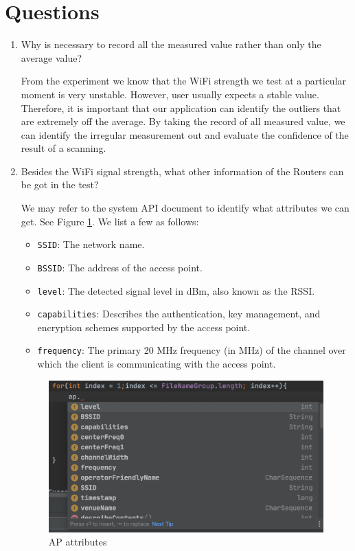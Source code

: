 \section{Questions}
\begin{enumerate}
  \item Why is necessary to record all the measured value rather than only the average value?
  
  From the experiment we know that the WiFi strength we test at a particular moment is very unstable. However, user usually expects a stable value. Therefore, it is important that our application can identify the outliers that are extremely off the average. By taking the record of all measured value, we can identify the irregular measurement out and evaluate the confidence of the result of a scanning.

  \item Besides the WiFi signal strength, what other information of the Routers can be got in the test?
  
  We may refer to the system API document to identify what attributes we can get. See Figure \ref{fig:attr}. We list a few as follows:
  \begin{itemize}
    \item \texttt{SSID}: The network name.
    \item \texttt{BSSID}: The address of the access point.
    \item \texttt{level}: The detected signal level in dBm, also known as the RSSI.
    \item \texttt{capabilities}: Describes the authentication, key management, and encryption schemes supported by the access point.
    \item \texttt{frequency}: The primary 20 MHz frequency (in MHz) of the channel over which the client is communicating with the access point.
  \end{itemize}

  \begin{figure}[hb]
    \begin{center}
    \includegraphics[width=12cm]{img/attr.png}
    \caption{AP attributes}
    \label{fig:attr}
    \end{center}
  \end{figure}


\end{enumerate}
